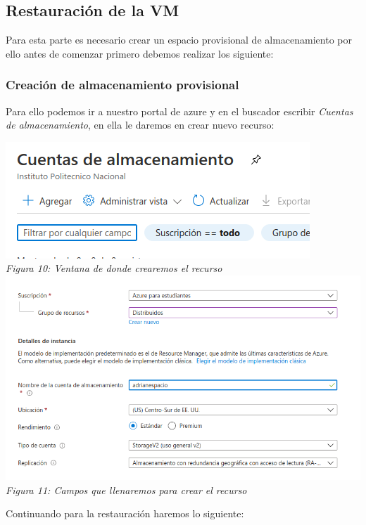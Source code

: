 \documentclass[10pt,executivepaper]{article}
\begin{document}
\subsection{Restauración de la VM}
Para esta parte es necesario crear un espacio provisional de almacenamiento por ello antes de comenzar primero debemos realizar los siguiente:
\subsubsection{Creación de almacenamiento provisional}
Para ello podemos ir a nuestro portal de azure y en el buscador escribir \textit{Cuentas de almacenamiento}, en ella le daremos en crear nuevo recurso:
\begin{center}
  \includegraphics[scale=0.5]{imgs/ventana_cuenta.png}\\
  \textit{Figura 10: Ventana de donde crearemos el recurso}\\
  \includegraphics[scale=0.5]{imgs/almacenamiento.png}\\
  \textit{Figura 11: Campos que llenaremos para crear el recurso}\vspace{1cm}
\end{center}
Continuando para la restauración haremos lo siguiente:
\end{document}
